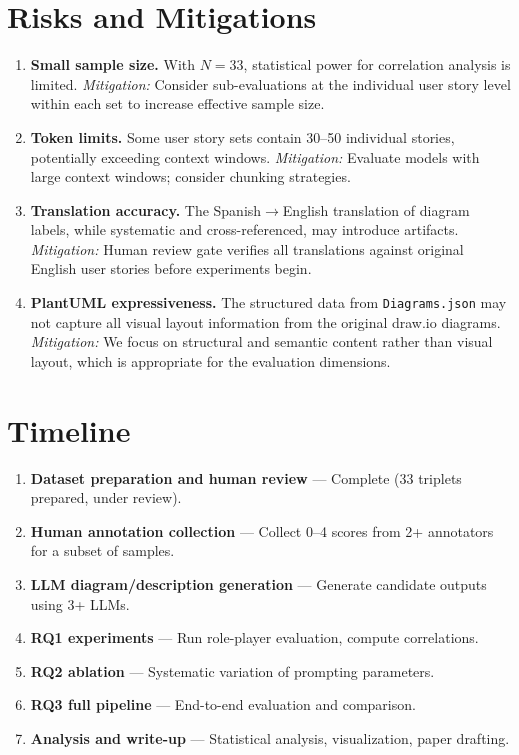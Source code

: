 \documentclass[lettersize,journal]{IEEEtran}
\begin{document}
\section{Risks and Mitigations}
\label{sec:risks}

\begin{enumerate}
    \item \textbf{Small sample size.} With $N=33$, statistical power for correlation analysis is limited. \emph{Mitigation:} Consider sub-evaluations at the individual user story level within each set to increase effective sample size.

    \item \textbf{Token limits.} Some user story sets contain 30--50 individual stories, potentially exceeding context windows. \emph{Mitigation:} Evaluate models with large context windows; consider chunking strategies.

    \item \textbf{Translation accuracy.} The Spanish$\rightarrow$English translation of diagram labels, while systematic and cross-referenced, may introduce artifacts. \emph{Mitigation:} Human review gate verifies all translations against original English user stories before experiments begin.

    \item \textbf{PlantUML expressiveness.} The structured data from \texttt{Diagrams.json} may not capture all visual layout information from the original draw.io diagrams. \emph{Mitigation:} We focus on structural and semantic content rather than visual layout, which is appropriate for the evaluation dimensions.
\end{enumerate}

\section{Timeline}
\label{sec:timeline}

\begin{enumerate}
    \item \textbf{Dataset preparation and human review} --- Complete (33 triplets prepared, under review).
    \item \textbf{Human annotation collection} --- Collect 0--4 scores from 2+ annotators for a subset of samples.
    \item \textbf{LLM diagram/description generation} --- Generate candidate outputs using 3+ LLMs.
    \item \textbf{RQ1 experiments} --- Run role-player evaluation, compute correlations.
    \item \textbf{RQ2 ablation} --- Systematic variation of prompting parameters.
    \item \textbf{RQ3 full pipeline} --- End-to-end evaluation and comparison.
    \item \textbf{Analysis and write-up} --- Statistical analysis, visualization, paper drafting.
\end{enumerate}
\end{document}
